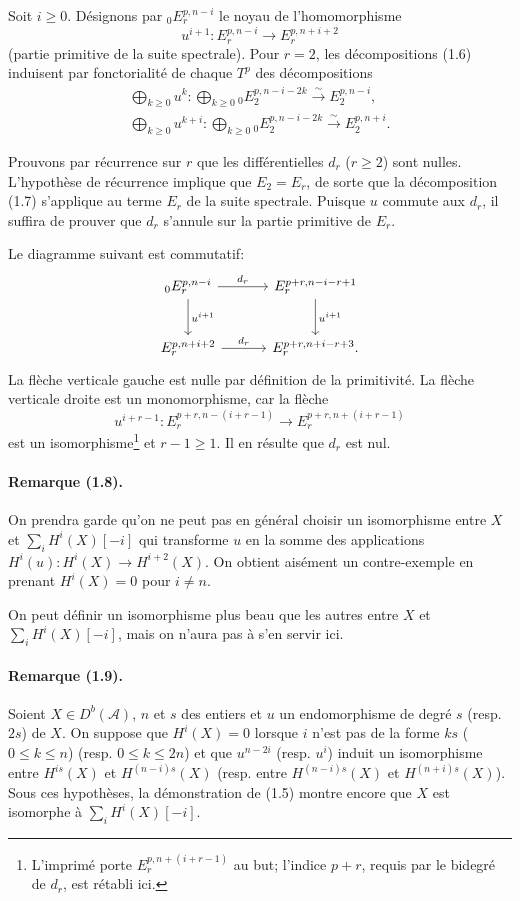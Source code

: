 \documentclass[10pt]{article}
\newcommand{\Acal}{\mathcal A}
\newcommand{\Db}{D^b}
\newcommand{\iso}{\xrightarrow{\sim}}
\newcommand{\og}{\guillemotleft}
\newcommand{\fg}{\guillemotright}
\providecommand{\og}{\guillemotleft}
\providecommand{\fg}{\guillemotright}
\begin{document}
Soit $i\ge0$. Désignons par ${}_0E_r^{p,n-i}$ le noyau de l'homomorphisme
\[
u^{i+1}:E_r^{p,n-i}\longrightarrow E_r^{p,n+i+2}
\]
(\og partie primitive\fg{} de la suite spectrale). Pour $r=2$, les décompositions (1.6) induisent par fonctorialité de chaque $T^p$ des décompositions
\[
\tag{1.7}
\begin{gathered}
\bigoplus_{k\ge0}u^k:\bigoplus_{k\ge0}{}_0E_2^{p,n-i-2k}\iso E_2^{p,n-i},\\
\bigoplus_{k\ge0}u^{k+i}:\bigoplus_{k\ge0}{}_0E_2^{p,n-i-2k}\iso E_2^{p,n+i}.
\end{gathered}
\]

Prouvons par récurrence sur $r$ que les différentielles $d_r$ ($r\ge2$) sont nulles. L'hypothèse de récurrence implique que $E_2=E_r$, de sorte que la décomposition (1.7) s'applique au terme $E_r$ de la suite spectrale. Puisque $u$ commute aux $d_r$, il suffira de prouver que $d_r$ s'annule sur la partie primitive de $E_r$.

Le diagramme suivant est commutatif:
\[
\begin{tikzcd}[column sep=3.2em,row sep=2.6em]
{}_0E_r^{p,n-i} \arrow[r,"d_r"] \arrow[d,"u^{i+1}"] & E_r^{p+r,n-i-r+1} \arrow[d,"u^{i+1}"]\\
E_r^{p,n+i+2} \arrow[r,"d_r"] & E_r^{p+r,n+i-r+3}.
\end{tikzcd}
\]
La flèche verticale gauche est nulle par définition de la primitivité. La flèche verticale droite est un monomorphisme, car la flèche
\[
u^{i+r-1}:E_r^{p+r,n-(i+r-1)}\longrightarrow E_r^{p+r,n+(i+r-1)}
\]
est un isomorphisme\footnote{L'imprimé porte $E_r^{p,n+(i+r-1)}$ au but; l'indice $p+r$, requis par le bidegré de $d_r$, est rétabli ici.} et $r-1\ge1$. Il en résulte que $d_r$ est nul.

\paragraph{Remarque (1.8).} On prendra garde qu'on ne peut pas en général choisir un isomorphisme entre $X$ et $\sum_iH^i(X)[-i]$ qui transforme $u$ en la somme des applications $H^i(u):H^i(X)\to H^{i+2}(X)$. On obtient aisément un contre-exemple en prenant $H^i(X)=0$ pour $i\ne n$.

On peut définir un isomorphisme \og plus beau que les autres\fg{} entre $X$ et $\sum_iH^i(X)[-i]$, mais on n'aura pas à s'en servir ici.

\paragraph{Remarque (1.9).} Soient $X\in\Db(\Acal)$, $n$ et $s$ des entiers et $u$ un endomorphisme de degré $s$ (resp. $2s$) de $X$. On suppose que $H^i(X)=0$ lorsque $i$ n'est pas de la forme $ks$ ($0\le k\le n$) (resp. $0\le k\le2n$) et que $u^{n-2i}$ (resp. $u^i$) induit un isomorphisme entre $H^{is}(X)$ et $H^{(n-i)s}(X)$ (resp. entre $H^{(n-i)s}(X)$ et $H^{(n+i)s}(X)$). Sous ces hypothèses, la démonstration de (1.5) montre encore que $X$ est isomorphe à $\sum_iH^i(X)[-i]$.
\end{document}
